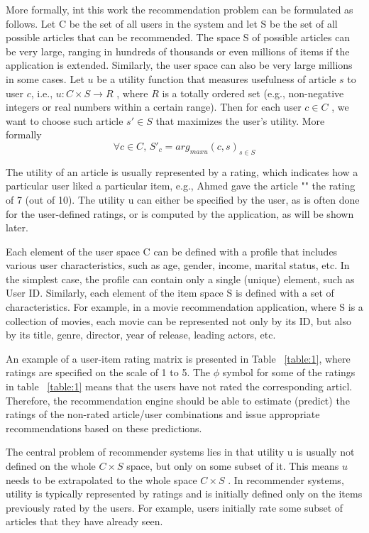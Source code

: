More formally, int this work the recommendation problem can be formulated as follows. Let C be the set of all users in the system and let S be the set of all possible articles that can be recommended. The space S of possible articles can be very large, ranging in hundreds of thousands or even millions of items if the application is extended.
Similarly, the user space can also be very large millions in some cases. Let $u$ be a utility function that measures usefulness of article $s$ to user $c$, i.e., $u :C \times S \rightarrow R$ , where $R$ is a totally ordered set (e.g., non-negative integers or real numbers within a certain range). Then for each user $c\in C$ , we want to choose such article $s' \in S$ that maximizes the user's utility. More formally
\begin{equation} \label{eq:1}
\forall c \in C,\, S'_c = arg_{max u} (c,s)_{s \in S}
\end{equation}

The utility of an article is usually represented by a rating, which indicates how a particular user liked a particular item, e.g., Ahmed gave the article "" the rating of 7 (out of 10). The utility u can either be specified by the user, as is often done for the user-defined ratings, or is computed by the application, as will be shown later.


Each element of the user space C can be defined with a profile that includes various user characteristics, such as age, gender, income, marital status, etc. In the simplest case, the profile can contain only a single (unique) element, such as User ID. Similarly, each element of the item space S is defined with a set of characteristics. For example, in a movie  recommendation application, where S is a collection of movies, each movie can be represented not only by its ID, but also by its title, genre, director, year of release, leading actors, etc.


 An example of a user-item rating matrix is presented in Table ~\ref{table:1}, where ratings are specified on the scale of 1 to 5. The $\phi$ symbol for some of the ratings in table ~\ref{table:1} means that the users have not rated the corresponding articl. Therefore, the recommendation engine should be able to estimate (predict) the ratings of the non-rated article/user combinations and issue appropriate recommendations based on these predictions.

The central problem of recommender systems lies in that utility u is usually not defined on the whole $C \times S$ space, but only on some subset of it. This means $u$ needs to be extrapolated to the whole space $C \times S$ . In recommender systems, utility is typically represented by ratings and is initially defined only on the items previously rated by the users. For example, users initially rate some subset of articles that they have already seen.


